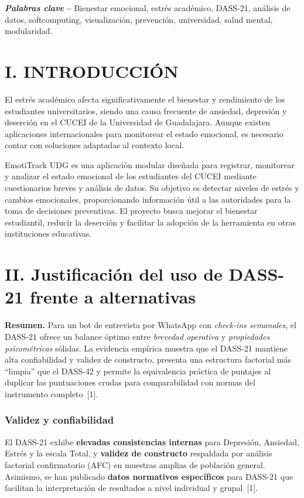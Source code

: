 ﻿\documentclass[10pt,twocolumn]{article}
\begin{document}
\noindent\textbf{\textit{Palabras clave}}\textbf{ -- }Bienestar emocional, estrés académico, DASS-21, análisis de datos, softcomputing, visualización, prevención, universidad, salud mental, modularidad.

\section*{I. INTRODUCCIÓN}
El estrés académico afecta significativamente el bienestar y rendimiento de los estudiantes universitarios, siendo una causa frecuente de ansiedad, depresión y deserción en el CUCEI de la Universidad de Guadalajara. Aunque existen aplicaciones internacionales para monitorear el estado emocional, es necesario contar con soluciones adaptadas al contexto local.

EmotiTrack UDG es una aplicación modular diseñada para registrar, monitorear y analizar el estado emocional de los estudiantes del CUCEI mediante cuestionarios breves y análisis de datos. Su objetivo es detectar niveles de estrés y cambios emocionales, proporcionando información útil a las autoridades para la toma de decisiones preventivas. El proyecto busca mejorar el bienestar estudiantil, reducir la deserción y facilitar la adopción de la herramienta en otras instituciones educativas.

\section*{II. Justificación del uso de DASS{-}21 frente a alternativas}

\textbf{Resumen.} Para un bot de entrevista por WhatsApp con \emph{check-ins semanales}, el DASS{-}21 ofrece un balance óptimo entre \emph{brevedad operativa} y \emph{propiedades psicométricas} sólidas. La evidencia empírica muestra que el DASS{-}21 mantiene alta confiabilidad y validez de constructo, presenta una estructura factorial más “limpia” que el DASS{-}42 y permite la equivalencia práctica de puntajes al duplicar las puntuaciones crudas para comparabilidad con normas del instrumento completo~[1].

\subsubsection*{Validez y confiabilidad}
El DASS{-}21 exhibe \textbf{elevadas consistencias internas} para Depresión, Ansiedad, Estrés y la escala Total, y \textbf{validez de constructo} respaldada por análisis factorial confirmatorio (AFC) en muestras amplias de población general. Asimismo, se han publicado \textbf{datos normativos específicos} para DASS{-}21 que facilitan la interpretación de resultados a nivel individual y grupal~[1].
\end{document}
